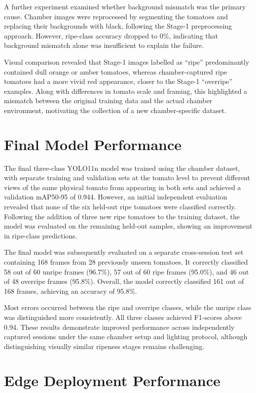 \documentclass[12pt,a4paper]{report}
\begin{document}
A further experiment examined whether background mismatch was the primary cause. Chamber images were reprocessed by segmenting the tomatoes and replacing their backgrounds with black, following the Stage-1 preprocessing approach. However, ripe-class accuracy dropped to 0\%, indicating that background mismatch alone was insufficient to explain the failure.

Visual comparison revealed that Stage-1 images labelled as ``ripe'' predominantly contained dull orange or amber tomatoes, whereas chamber-captured ripe tomatoes had a more vivid red appearance, closer to the Stage-1 ``overripe'' examples. Along with differences in tomato scale and framing, this highlighted a mismatch between the original training data and the actual chamber environment, motivating the collection of a new chamber-specific dataset.
\section{Final Model Performance}

The final three-class YOLO11n model was trained using the chamber dataset, with separate training and validation sets at the tomato level to prevent different views of the same physical tomato from appearing in both sets and achieved a validation mAP50-95 of 0.944. However, an initial independent evaluation revealed that none of the six held-out ripe tomatoes were classified correctly. Following the addition of three new ripe tomatoes to the training dataset, the model was evaluated on the remaining held-out samples, showing an improvement in ripe-class predictions.

The final model was subsequently evaluated on a separate cross-session test set containing 168 frames from 28 previously unseen tomatoes. It correctly classified 58 out of 60 unripe frames (96.7\%), 57 out of 60 ripe frames (95.0\%), and 46 out of 48 overripe frames (95.8\%). Overall, the model correctly classified 161 out of 168 frames, achieving an accuracy of 95.8\%.

Most errors occurred between the ripe and overripe classes, while the unripe class was distinguished more consistently. All three classes achieved F1-scores above 0.94. These results demonstrate improved performance across independently captured sessions under the same chamber setup and lighting protocol, although distinguishing visually similar ripeness stages remains challenging.

\section{Edge Deployment Performance}
\end{document}
